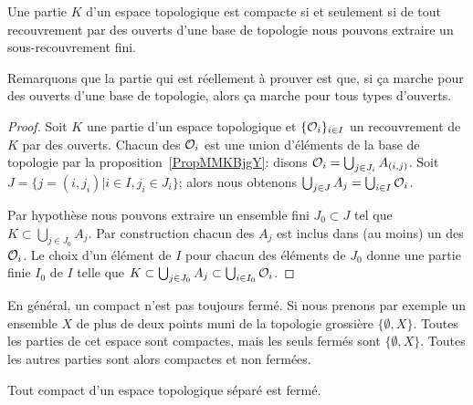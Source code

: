 \begin{lemma}   \label{LemOWVooZKndbI}
    Une partie \( K\) d'un espace topologique est compacte si et seulement si de tout recouvrement par des ouverts d'une base de topologie nous pouvons extraire un sous-recouvrement fini.
\end{lemma}
Remarquons que la partie qui est réellement à prouver est que, si \og ça marche \fg{} pour des ouverts d'une base de topologie, alors \og ça marche\fg{} pour tous types d'ouverts.
\begin{proof}
    Soit \( K\) une partie d'un espace topologique et \( \{ \mathcal{O}_i \}_{i\in I}\) un recouvrement de \( K\) par des ouverts. Chacun des \( \mathcal{O}_i\) est une union d'éléments de la base de topologie par la proposition~\ref{PropMMKBjgY}: disons \( \mathcal{O}_i = \bigcup_{j \in J_i} A_{(i,j)} \). Soit \( J = \{ j = (i, j_i) | i \in I, j_i \in J_i \} \); alors nous obtenons  \( \bigcup_{j\in J}A_j=\bigcup_{i\in I}\mathcal{O}_i\).

    Par hypothèse nous pouvons extraire un ensemble fini \( J_0\subset J\) tel que \( K\subset\bigcup_{j\in J_0}A_j\). Par construction chacun des \( A_j\) est inclus dans (au moins) un des \( \mathcal{O}_i\). Le choix d'un élément de \( I\) pour chacun des éléments de \( J_0\) donne une partie finie \( I_0\) de \( I\) telle que \( K\subset\bigcup_{j\in J_0}A_j\subset\bigcup_{i\in I_0}\mathcal{O}_i\).
\end{proof}

\begin{example}
    En général, un compact n'est pas toujours fermé. Si nous prenons par exemple un ensemble \( X\) de plus de deux points muni de la topologie grossière \( \{ \emptyset,X \}\). Toutes les parties de cet espace sont compactes, mais les seuls fermés sont \( \{ \emptyset,X \}\). Toutes les autres parties sont alors compactes et non fermées.
\end{example}

\begin{proposition}\label{PropUCUknHx}
    Tout compact d'un espace topologique séparé est fermé.
\end{proposition}

